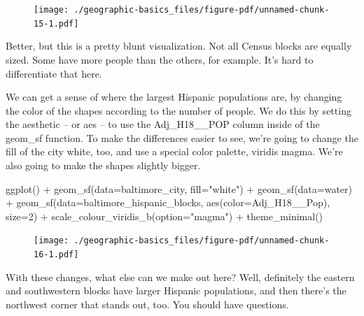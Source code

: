 \documentclass[
  letterpaper,
  DIV=11,
  numbers=noendperiod]{scrreprt}
\newenvironment{Shaded}{\begin{snugshade}}{\end{snugshade}}
\newcommand{\AttributeTok}[1]{\textcolor[rgb]{0.40,0.45,0.13}{#1}}
\newcommand{\DecValTok}[1]{\textcolor[rgb]{0.68,0.00,0.00}{#1}}
\newcommand{\FunctionTok}[1]{\textcolor[rgb]{0.28,0.35,0.67}{#1}}
\newcommand{\NormalTok}[1]{\textcolor[rgb]{0.00,0.23,0.31}{#1}}
\newcommand{\SpecialCharTok}[1]{\textcolor[rgb]{0.37,0.37,0.37}{#1}}
\newcommand{\StringTok}[1]{\textcolor[rgb]{0.13,0.47,0.30}{#1}}
\begin{document}
\begin{figure}[H]

{\centering \texttt{[image: ./geographic-basics\_files/figure-pdf/unnamed-chunk-15-1.pdf]}

}

\end{figure}

Better, but this is a pretty blunt visualization. Not all Census blocks
are equally sized. Some have more people than the others, for example.
It's hard to differentiate that here.

We can get a sense of where the largest Hispanic populations are, by
changing the color of the shapes according to the number of people. We
do this by setting the aesthetic -- or aes -- to use the Adj\_H18\_\_POP
column inside of the geom\_sf function. To make the differences easier
to see, we're going to change the fill of the city white, too, and use a
special color palette, viridis magma. We're also going to make the
shapes slightly bigger.

\begin{Shaded}
\begin{Highlighting}[]
\FunctionTok{ggplot}\NormalTok{() }\SpecialCharTok{+}
  \FunctionTok{geom\_sf}\NormalTok{(}\AttributeTok{data=}\NormalTok{baltimore\_city, }\AttributeTok{fill=}\StringTok{"white"}\NormalTok{) }\SpecialCharTok{+}
  \FunctionTok{geom\_sf}\NormalTok{(}\AttributeTok{data=}\NormalTok{water) }\SpecialCharTok{+}
  \FunctionTok{geom\_sf}\NormalTok{(}\AttributeTok{data=}\NormalTok{baltimore\_hispanic\_blocks, }\FunctionTok{aes}\NormalTok{(}\AttributeTok{color=}\NormalTok{Adj\_H18\_\_Pop), }\AttributeTok{size=}\DecValTok{2}\NormalTok{) }\SpecialCharTok{+}
  \FunctionTok{scale\_colour\_viridis\_b}\NormalTok{(}\AttributeTok{option=}\StringTok{"magma"}\NormalTok{) }\SpecialCharTok{+}
  \FunctionTok{theme\_minimal}\NormalTok{()}
\end{Highlighting}
\end{Shaded}

\begin{figure}[H]

{\centering \texttt{[image: ./geographic-basics\_files/figure-pdf/unnamed-chunk-16-1.pdf]}

}

\end{figure}

With these changes, what else can we make out here? Well, definitely the
eastern and southwestern blocks have larger Hispanic populations, and
then there's the northwest corner that stands out, too. You should have
questions.
\end{document}
